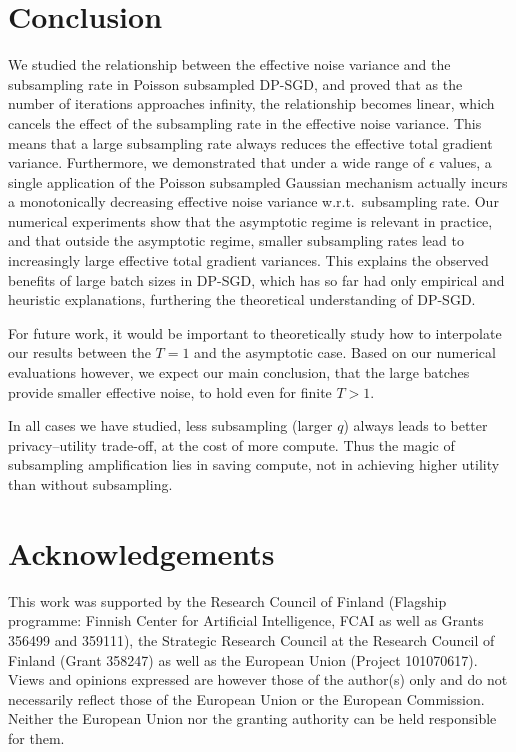 \documentclass{article}
\theoremstyle{plain}
\theoremstyle{definition}
\theoremstyle{remark}
\begin{document}
\section{Conclusion}
We studied the relationship between the effective noise variance and the subsampling
rate in Poisson subsampled DP-SGD, and proved that as the number of iterations
approaches infinity, the relationship becomes linear, which cancels 
the effect of the subsampling rate in the effective noise variance. This means 
that a large subsampling rate always reduces the effective total gradient variance.
Furthermore, we demonstrated that under a wide range of $\epsilon$ values,
a single application of the Poisson subsampled Gaussian mechanism actually
incurs a monotonically decreasing effective noise variance w.r.t.\  subsampling rate.
Our numerical experiments show that the asymptotic regime is relevant in practice, and
that outside the asymptotic regime, smaller subsampling rates lead to increasingly large effective total gradient variances. This explains the observed benefits of large batch sizes 
in DP-SGD, which has so far had only empirical and heuristic explanations, furthering the 
theoretical understanding of DP-SGD.

For future work, it would be important to theoretically study how to interpolate
our results between the $T=1$ and the asymptotic case. Based on our numerical
evaluations however, we expect our main conclusion, that the large batches
provide smaller effective noise, to hold even for finite $T>1$.

In all cases we have studied, less subsampling (larger $q$) always leads to better privacy--utility trade-off, at the cost of more compute.
Thus the magic of subsampling amplification lies in saving compute, not in achieving higher utility than without subsampling.

\section*{Acknowledgements}
This work was supported by the Research Council of Finland 
(Flagship programme: Finnish Center for Artificial Intelligence, 
FCAI as well as Grants 356499 and 359111), the Strategic Research Council 
at the Research Council of Finland (Grant 358247)
as well as the European Union (Project
101070617). Views and opinions expressed are however
those of the author(s) only and do not necessarily reflect
those of the European Union or the European Commission. Neither the European 
Union nor the granting authority can be held responsible for them.
\end{document}

